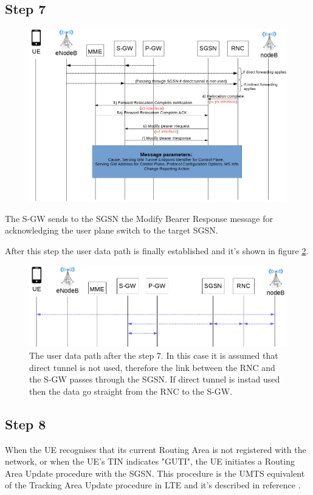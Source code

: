 \subsection*{Step 7}
\begin{figure}[!htb]
	\centering
	\includegraphics[width=0.9\linewidth]{img/execution-7.png}
	\label{fig:exec-7}
\end{figure}
The S-GW sends to the SGSN the Modify Bearer Response message for acknowledging
the user plane switch to the target SGSN.

After this step the user data path is finally established and it's shown in
figure \ref{fig:final-data-path}.

\begin{figure}[!htb]
	\centering
	\includegraphics[width=0.9\linewidth]{img/final-data-path.png}
	\caption{The user data path after the step 7. In this case it is assumed that
	direct tunnel is not used, therefore the link between the RNC and the S-GW passes
	through the SGSN. If direct tunnel is instad used then the data go straight
	from the RNC to the S-GW.}
	\label{fig:final-data-path}
\end{figure}




\subsection*{Step 8}
When the UE recognises that its current Routing Area is not registered with the
network, or when the UE's TIN indicates "GUTI", the UE initiates a Routing Area
Update procedure with the SGSN. This procedure is the UMTS equivalent of the
Tracking Area Update procedure in LTE and it's described in reference
\cite{routing-area-update}.




